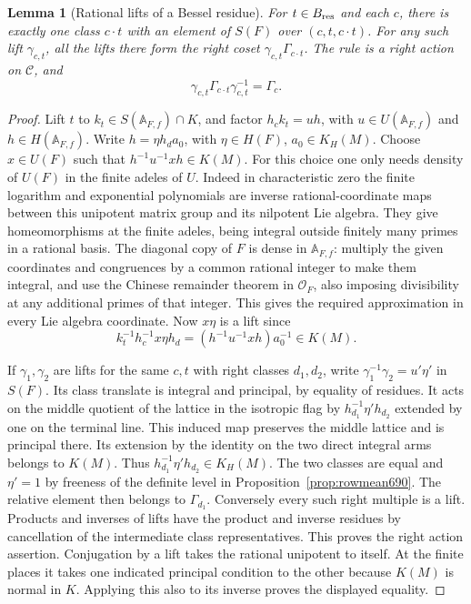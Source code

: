 \documentclass[a4paper,11pt]{article}
\newtheorem{lemma}[proposition]{Lemma}
\theoremstyle{definition}
\theoremstyle{remark}
\numberwithin{equation}{section}
\begin{document}
\begin{lemma}[Rational lifts of a Bessel residue]\leavevmode
\label{lem:residuelifts701}
For \(t\in B_{\rm res}\) and each \(c\), there is exactly one
class \(c\cdot t\) with an element of \(S(F)\) over
\((c,t,c\cdot t)\). For any such lift \(\gamma_{c,t}\), all the
lifts there form the right coset \(\gamma_{c,t}\Gamma_{c\cdot t}\).
The rule is a right action on \(\mathcal C\), and
\[
  \gamma_{c,t}\Gamma_{c\cdot t}\gamma_{c,t}^{-1}=\Gamma_c .
\]
\end{lemma}
\begin{proof}
Lift \(t\) to \(k_t\in S(\mathbb A_{F,f})\cap K\), and factor
\(h_ck_t=u h\), with \(u\in U(\mathbb A_{F,f})\) and
\(h\in H(\mathbb A_{F,f})\). Write \(h=\eta h_d a_0\), with
\(\eta\in H(F)\), \(a_0\in K_H(M)\). Choose \(x\in U(F)\)
such that \(h^{-1}u^{-1}xh\in K(M)\). For this choice one only
needs density of \(U(F)\) in the finite adeles of \(U\). Indeed
in characteristic zero the finite logarithm and exponential
polynomials are inverse rational-coordinate maps between this
unipotent matrix group and its nilpotent Lie algebra. They give
homeomorphisms at the finite adeles, being integral outside
finitely many primes in a rational basis. The diagonal copy of
\(F\) is dense in \(\mathbb A_{F,f}\): multiply the given
coordinates and congruences by a common rational integer to
make them integral, and use the Chinese remainder theorem in
\(\mathcal O_F\), also imposing divisibility at any additional
primes of that integer. This gives the required approximation
in every Lie algebra coordinate. Now \(x\eta\) is a lift since
\[
 k_t^{-1}h_c^{-1}x\eta h_d
       =(h^{-1}u^{-1}xh)a_0^{-1}\in K(M).
\]

If \(\gamma_1,\gamma_2\) are lifts for the same \(c,t\) with
right classes \(d_1,d_2\), write
\(\gamma_1^{-1}\gamma_2=u'\eta'\) in \(S(F)\).
Its class translate is integral and principal, by equality
of residues. It acts on the middle quotient of the lattice
in the isotropic flag by \(h_{d_1}^{-1}\eta'h_{d_2}\) extended
by one on the terminal line. This induced map preserves the
middle lattice and is principal there. Its extension by the
identity on the two direct integral arms belongs to \(K(M)\).
Thus \(h_{d_1}^{-1}\eta'h_{d_2}\in K_H(M)\). The two classes
are equal and \(\eta'=1\) by freeness of the definite level
in Proposition~\ref{prop:rowmean690}. The relative element
then belongs to \(\Gamma_{d_1}\). Conversely every such right
multiple is a lift. Products and inverses of lifts have the
product and inverse residues by cancellation of the intermediate
class representatives. This proves the right action assertion.
Conjugation by a lift takes the rational unipotent to itself.
At the finite places it takes one indicated principal condition
to the other because \(K(M)\) is normal in \(K\). Applying
this also to its inverse proves the displayed equality.
\end{proof}
\end{document}
